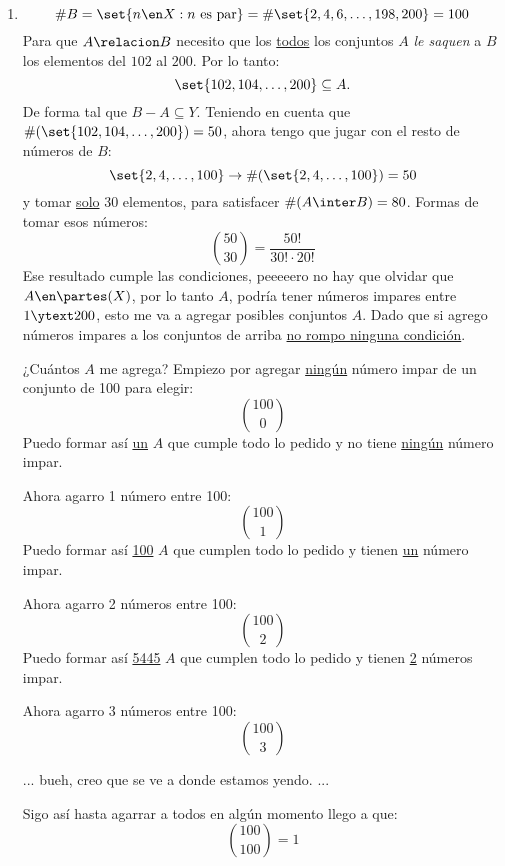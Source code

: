 \begin{enumerate}[label=\alph*)]
  \item
        $$
          \#B = \set{n \en X : n \text{ es par} } = \#\set{2,4,6,\dots,198,200} = 100
        $$
        Para que $A \relacion B$ necesito que los \underline{todos} los conjuntos $A$ \textit{le saquen} a $B$
        los elementos del $102$ al $200$. Por lo tanto:
        $$
          \set{102, 104, \dots, 200} \subseteq A.
        $$
        De forma tal que $B - A \subseteq Y$. Teniendo en cuenta que $\#(\set{102, 104, \dots, 200}) = 50$, ahora tengo que jugar con el
        resto de números de $B$:
        $$
          \set{2, 4, \dots, 100}
          \to
          \#(\set{2, 4, \dots, 100}) = 50
        $$
        y tomar \underline{solo} 30 elementos, para satisfacer $\#(A \inter B) = 80$. Formas de tomar esos números:
        $$
          \binom{50}{30} = \frac{50!}{30! \cdot 20!}
        $$
        Ese resultado cumple las condiciones, peeeeero no hay que olvidar que $A \en \partes(X)$,
        por lo tanto $A$, podría tener números impares entre $1 \ytext 200$, esto me va a agregar posibles conjuntos $A$. Dado
        que si agrego números impares a los conjuntos de arriba \underline{no rompo ninguna condición}.

        \medskip

        ¿Cuántos $A$ me agrega?
        Empiezo por agregar \underline{ningún} número impar de un conjunto de 100 para elegir:
        $$
          \binom{100}{0}
        $$
        Puedo formar así \underline{un} $A$ que cumple todo lo pedido y no tiene \underline{ningún} número impar.

        Ahora agarro 1 número entre 100:
        $$
          \binom{100}{1}
        $$
        Puedo formar así \underline{100} $A$ que cumplen todo lo pedido y tienen \underline{un} número impar.

        Ahora agarro 2 números entre 100:
        $$
          \binom{100}{2}
        $$
        Puedo formar así \underline{5445} $A$ que cumplen todo lo pedido y tienen \underline{2} números impar.

        Ahora agarro 3 números entre 100:
        $$
          \binom{100}{3}
        $$

        \bigskip

        \begin{center}
          ...
          bueh, creo que se ve a donde estamos yendo.
          ...
        \end{center}

        \bigskip

        Sigo así hasta agarrar a todos en algún momento llego a que:
        $$
          \binom{100}{100} = 1
        $$


\end{enumerate}
